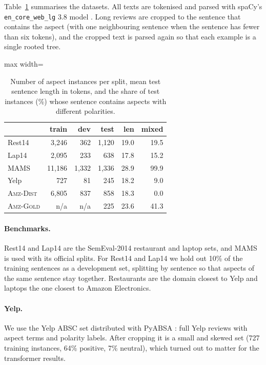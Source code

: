 \documentclass[11pt]{article}
\newcommand{\gold}{\textsc{Amz-Gold}}
\newcommand{\dist}{\textsc{Amz-Dist}}
\begin{document}
Table~\ref{tab:data} summarises the datasets. All texts are tokenised and parsed with spaCy's \texttt{en\_core\_web\_lg} 3.8 model \citep{honnibal2020spacy}. Long reviews are cropped to the sentence that contains the aspect (with one neighbouring sentence when the sentence has fewer than six tokens), and the cropped text is parsed again so that each example is a single rooted tree.

\begin{table}[t]
\centering
\small
\setlength{\tabcolsep}{4pt}
\begin{adjustbox}{max width=\columnwidth}
\begin{tabular}{lrrrrr}
\toprule
 & train & dev & test & len & mixed \\
\midrule
Rest14 & 3,246 & 362 & 1,120 & 19.0 & 19.5 \\
Lap14 & 2,095 & 233 & 638 & 17.8 & 15.2 \\
MAMS & 11,186 & 1,332 & 1,336 & 28.9 & 99.9 \\
Yelp & 727 & 81 & 245 & 18.2 & 9.0 \\
\dist & 6,805 & 837 & 858 & 18.3 & 0.0 \\
\gold & n/a & n/a & 225 & 23.6 & 41.3 \\
\bottomrule
\end{tabular}
\end{adjustbox}
\caption{Number of aspect instances per split, mean test sentence length in tokens, and the share of test instances (\%) whose sentence contains aspects with different polarities.}
\label{tab:data}
\end{table}

\paragraph{Benchmarks.} Rest14 and Lap14 are the SemEval-2014 restaurant and laptop sets, and MAMS is used with its official splits. For Rest14 and Lap14 we hold out 10\% of the training sentences as a development set, splitting by sentence so that aspects of the same sentence stay together. Restaurants are the domain closest to Yelp and laptops the one closest to Amazon Electronics.

\paragraph{Yelp.} We use the Yelp ABSC set distributed with PyABSA \citep{yang2023pyabsa}: full Yelp reviews with aspect terms and polarity labels. After cropping it is a small and skewed set (727 training instances, 64\% positive, 7\% neutral), which turned out to matter for the transformer results.
\end{document}
